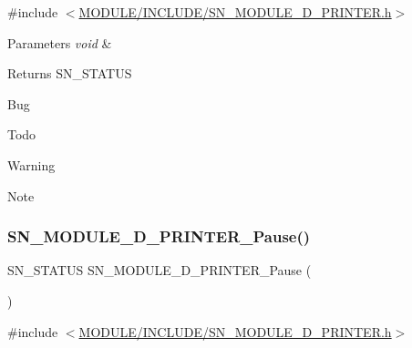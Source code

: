 {\ttfamily \#include $<$\hyperlink{SN__MODULE__3D__PRINTER_8h}{M\+O\+D\+U\+L\+E/\+I\+N\+C\+L\+U\+D\+E/\+S\+N\+\_\+\+M\+O\+D\+U\+L\+E\+\_\+D\+\_\+\+P\+R\+I\+N\+T\+E\+R.\+h}$>$}


\begin{DoxyParams}{Parameters}
{\em void} & \\
\hline
\end{DoxyParams}
\begin{DoxyReturn}{Returns}
S\+N\+\_\+\+S\+T\+A\+T\+US 
\end{DoxyReturn}
\begin{DoxyRefDesc}{Bug}
\item[\hyperlink{bug__bug000008}{Bug}]\end{DoxyRefDesc}
\begin{DoxyRefDesc}{Todo}
\item[\hyperlink{todo__todo000008}{Todo}]\end{DoxyRefDesc}
\begin{DoxyWarning}{Warning}

\end{DoxyWarning}
\begin{DoxyNote}{Note}

\end{DoxyNote}
\mbox{\label{group__PRINTER_ga84a03238ddc0021011c12839757bf8c2}} 
\subsubsection{\texorpdfstring{S\+N\+\_\+\+M\+O\+D\+U\+L\+E\+\_\+D\+\_\+\+P\+R\+I\+N\+T\+E\+R\+\_\+\+Pause()}{SN\_MODULE\_3D\_PRINTER\_Pause()}}
{\footnotesize\ttfamily S\+N\+\_\+\+S\+T\+A\+T\+US S\+N\+\_\+\+M\+O\+D\+U\+L\+E\+\_\+D\+\_\+\+P\+R\+I\+N\+T\+E\+R\+\_\+\+Pause (\begin{DoxyParamCaption}\item[{void}]{ }\end{DoxyParamCaption})}



{\ttfamily \#include $<$\hyperlink{SN__MODULE__3D__PRINTER_8h}{M\+O\+D\+U\+L\+E/\+I\+N\+C\+L\+U\+D\+E/\+S\+N\+\_\+\+M\+O\+D\+U\+L\+E\+\_\+D\+\_\+\+P\+R\+I\+N\+T\+E\+R.\+h}$>$}


